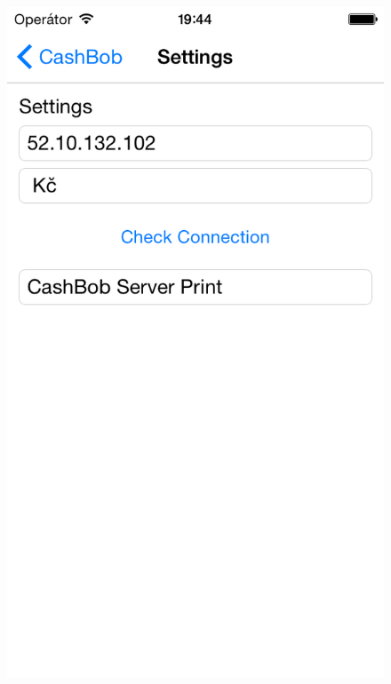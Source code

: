 \begin{figure}[h]
\centering
\begin{minipage}{.5\textwidth}
  \centering
  \includegraphics[width=.95\textwidth]{settings.png}
  \label{fig:settingspage}
\end{minipage}%
\begin{minipage}{.5\textwidth}
  \centering

\end{minipage}
\end{figure}
